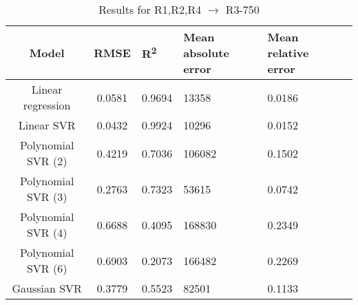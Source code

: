 \begin{table}[H]
\centering
\begin{adjustbox}{center}
\begin{tabular}{c | c M{1.2cm} M{2.5cm} M{2.5cm} M{1.8cm}}
Model & RMSE & R\textsuperscript{2} & Mean absolute error & Mean relative error \tabularnewline
\hline
Linear regression & 0.0581 & 0.9694 &  13358 & 0.0186 \\
Linear SVR & 0.0432 & 0.9924 &  10296 & 0.0152 \\
Polynomial SVR (2) & 0.4219 & 0.7036 & 106082 & 0.1502 \\
Polynomial SVR (3) & 0.2763 & 0.7323 &  53615 & 0.0742 \\
Polynomial SVR (4) & 0.6688 & 0.4095 & 168830 & 0.2349 \\
Polynomial SVR (6) & 0.6903 & 0.2073 & 166482 & 0.2269 \\
Gaussian SVR & 0.3779 & 0.5523 &  82501 & 0.1133 \\
\end{tabular}
\end{adjustbox}
\\
\caption{Results for R1,R2,R4 $\rightarrow$ R3-750}
\label{tab:coreonly_linear_R1,R2,R4_R3_750}
\end{table}
